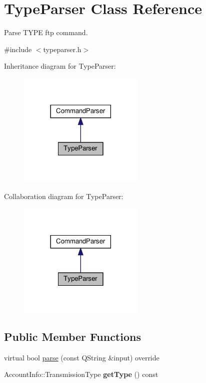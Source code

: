 \hypertarget{classTypeParser}{}\section{Type\+Parser Class Reference}
\label{classTypeParser}


Parse T\+Y\+PE ftp command.  




{\ttfamily \#include $<$typeparser.\+h$>$}



Inheritance diagram for Type\+Parser\+:\nopagebreak
\begin{figure}[H]
\begin{center}
\leavevmode
\includegraphics[width=170pt]{df/d57/classTypeParser__inherit__graph}
\end{center}
\end{figure}


Collaboration diagram for Type\+Parser\+:\nopagebreak
\begin{figure}[H]
\begin{center}
\leavevmode
\includegraphics[width=170pt]{db/dae/classTypeParser__coll__graph}
\end{center}
\end{figure}
\subsection*{Public Member Functions}
\begin{DoxyCompactItemize}
\item 
virtual bool \hyperlink{classTypeParser_afc5fc9fbf55f8ecec885312dd396a353}{parse} (const Q\+String \&input) override
\item 
\mbox{\label{classTypeParser_a4015f9bc960c7f8c9bb80e0116d9a793}} 
Account\+Info\+::\+Transmission\+Type {\bfseries get\+Type} () const
\end{DoxyCompactItemize}



